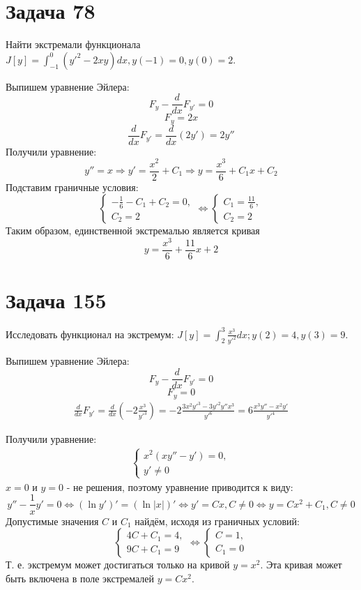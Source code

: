 \documentclass[11pt]{article}
\begin{document}
\section{Задача 78}
\label{sec:orgd516864}
Найти экстремали функционала \(J[y] = \int_{-1}^0(y'^2 - 2xy)dx, y(-1) = 0, y(0) = 2\).

Выпишем уравнение Эйлера:
$$F_y - \frac{d}{dx}F_{y'} = 0$$
$$F_y = 2x$$
$$\frac{d}{dx}F_{y'} = \frac{d}{dx}(2y') = 2y''$$
Получили уравнение:
$$y'' = x \Rightarrow y' = \frac{x^2}2 + C_1 \Rightarrow y = \frac{x^3}6 + C_1x + C_2$$
Подставим граничные условия:
\begin{equation*}
\begin{cases}
-\frac{1}6 - C_1 + C_2 = 0, \\
C_2 = 2
\end{cases}
\Leftrightarrow
\begin{cases}
C_1 = \frac{11}6, \\
C_2 = 2
\end{cases}
\end{equation*}
Таким образом, единственной экстремалью является кривая
$$y = \frac{x^3}6 + \frac{11}6x + 2$$
\section{Задача 155}
\label{sec:org0bf41fa}
Исследовать функционал на экстремум: \(J[y] = \int_2^3\frac{x^3}{y'^2}dx; y(2) = 4, y(3) = 9\).

Выпишем уравнение Эйлера:
$$F_y - \frac{d}{dx}F_{y'} = 0$$
$$F_y = 0$$
\begin{multline*}
\frac{d}{dx}F_{y'} = \frac{d}{dx}\left(-2\frac{x^3}{y'^3}\right) = -2\frac{3x^2y'^3 - 3y'^2y''x^3}{y'^6}
= 6\frac{x^3y'' - x^2y'}{y'^4}
\end{multline*}

Получили уравнение:
\begin{multline*}
\begin{cases}
x^2(xy'' - y') = 0, \\
y' \neq 0
\end{cases}
\end{multline*}
\(x = 0\) и \(y = 0\) - не решения, поэтому уравнение приводится к виду:
$$y'' - \frac{1}xy' = 0 \Leftrightarrow (\ln y')' = (\ln |x|)' \Leftrightarrow y' = Cx, C \neq 0
\Leftrightarrow y = Cx^2 + C_1, C \neq 0$$
Допустимые значения \(C\) и \(C_1\) найдём, исходя из граничных условий:
\begin{equation*}
\begin{cases}
4C + C_1 = 4, \\
9C + C_1 = 9
\end{cases}
\Leftrightarrow
\begin{cases}
C = 1, \\
C_1 = 0
\end{cases}
\end{equation*}
Т. е. экстремум может достигаться только на кривой \(y = x^2\). Эта кривая может быть включена в поле экстремалей
\(y = Cx^2\).
\end{document}
